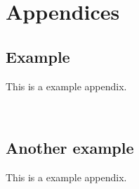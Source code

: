 \documentclass[12pt,a4paper]{book}
\begin{document}
\printbibliography[heading=bibintoc,title={References}]

\appendix
\chapter*{Appendices}
\renewcommand{\thesection}{\Alph{section}}

\section{Example}
\label{appendix:example}
This is a example appendix.

\newpage
\
\newpage
\section{Another example}
\label{appendix:another_example}
This is a example appendix.
\end{document}
